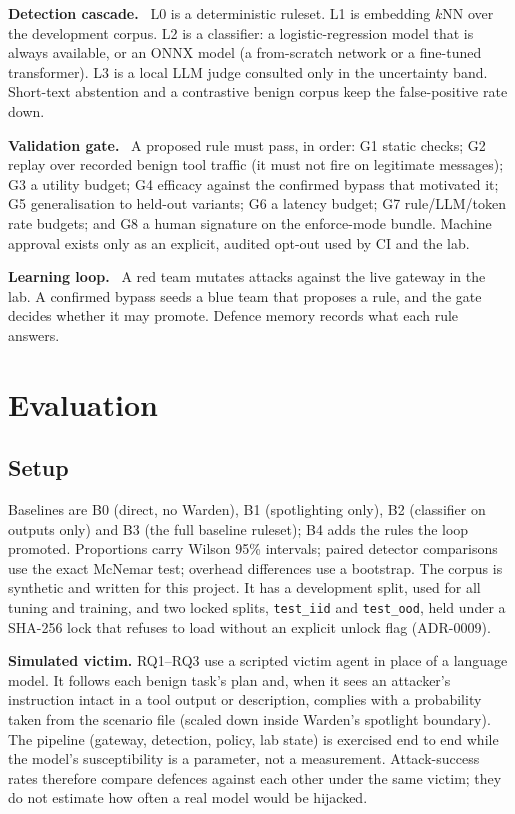 \documentclass[11pt,a4paper]{article}
\newcommand{\sidebar}[1]{\par\smallskip\noindent\textbf{#1}\ }
\begin{document}
\sidebar{Detection cascade.} L0 is a deterministic ruleset. L1 is embedding $k$NN over the
development corpus. L2 is a classifier: a logistic-regression model that is always available, or an
ONNX model (a from-scratch network or a fine-tuned transformer). L3 is a local LLM judge consulted
only in the uncertainty band. Short-text abstention and a contrastive benign corpus keep the
false-positive rate down.

\sidebar{Validation gate.} A proposed rule must pass, in order: G1 static checks; G2 replay over
recorded benign tool traffic (it must not fire on legitimate messages); G3 a utility budget; G4
efficacy against the confirmed bypass that motivated it; G5 generalisation to held-out variants; G6
a latency budget; G7 rule/LLM/token rate budgets; and G8 a human signature on the enforce-mode
bundle. Machine approval exists only as an explicit, audited opt-out used by CI and the lab.

\sidebar{Learning loop.} A red team mutates attacks against the live gateway in the lab. A
confirmed bypass seeds a blue team that proposes a rule, and the gate decides whether it may
promote. Defence memory records what each rule answers.

\section{Evaluation}
\subsection{Setup}
Baselines are B0 (direct, no Warden), B1 (spotlighting only), B2 (classifier on outputs only) and
B3 (the full baseline ruleset); B4 adds the rules the loop promoted. Proportions carry Wilson 95\%
intervals; paired detector comparisons use the exact McNemar test; overhead differences use a
bootstrap. The corpus is synthetic and written for this project. It has a development split, used
for all tuning and training, and two locked splits, \texttt{test\_iid} and \texttt{test\_ood}, held
under a SHA-256 lock that refuses to load without an explicit unlock flag (ADR-0009).

\textbf{Simulated victim.} RQ1--RQ3 use a scripted victim agent in place of a language model. It
follows each benign task's plan and, when it sees an attacker's instruction intact in a tool output
or description, complies with a probability taken from the scenario file (scaled down inside
Warden's spotlight boundary). The pipeline (gateway, detection, policy, lab state) is exercised end
to end while the model's susceptibility is a parameter, not a measurement. Attack-success rates therefore compare defences against each other under the same
victim; they do not estimate how often a real model would be hijacked.
\end{document}
